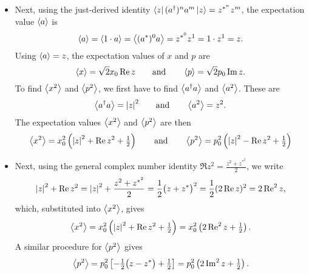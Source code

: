 \documentclass[11pt, a4paper]{article}
\newcommand{\eqtext}[1]{\qquad \text{#1} \qquad}
\newcommand{\evb}[1]{\big \langle {#1} \big \rangle}  %
\begin{document}
\begin{itemize}
	\item Next, using the just-derived identity $ \bra{z}(a^{\dagger})^{n}a^{m}\ket{z} = z^{*^{n}}z^{m} $, the expectation value $ \ev{a} $ is
	\begin{equation*}
		\ev{a} = \ev{1\cdot a} = \ev{(a^{*})^{0}a} = z^{*^{0}}z^{1} = 1 \cdot z^{1} = z.
	\end{equation*}
	Using $ \ev{a} = z $, the expectation values of $ x $ and $ p $ are
	\begin{equation*}
		\ev{x} = \sqrt{2} x_{0}\Re z \eqtext{and} \ev{p} = \sqrt{2}p_{0}\Im z.
	\end{equation*}
	To find $ \ev{x^{2}} $ and $ \ev{p^{2}} $, we first have to find $ \ev{a^{\dagger}a} $ and $ \ev{a^{2}} $. These are
	\begin{equation*}
		\evb{a^{\dagger}a} = \abs{z}^{2} \eqtext{and} \ev{a^{2}} = z^{2}.
	\end{equation*}
	The expectation values $ \ev{x^{2}} $ and $ \ev{p^{2}} $ are then
	\begin{equation*}
		\ev{x^{2}} = x_{0}^{2} \left(\abs{z}^{2} + \Re z^{2} + \tfrac{1}{2}\right) \eqtext{and} \ev{p^{2}} = p_{0}^{2}\left(\abs{z}^{2} - \Re z^{2} + \tfrac{1}{2}\right)
	\end{equation*}
	
	\item Next, using the  general complex number identity $ \Re z^{2} = \frac{z^{2}+z^{*^{2}}}{2}  $, we write
	\begin{equation*}
		\abs{z}^{2} + \Re z^{2} = \abs{z}^{2} + \frac{z^{2}+z^{*^{2}}}{2} = \frac{1}{2}\big(z + z^{*}\big)^{2} = \frac{1}{2}(2\Re z)^{2} = 2 \Re^{2}z,
	\end{equation*}
	which, substituted into $ \ev{x^{2}} $, gives
	\begin{equation*}
		\ev{x^{2}} = x_{0}^{2} \left(\abs{z}^{2} + \Re z^{2} + \tfrac{1}{2}\right) = x_{0}^{2}\left(2 \Re^{2}z + \tfrac{1}{2}\right).
	\end{equation*}
	A similar procedure for $ \ev{p^{2}} $ gives
	\begin{equation*}
		\ev{p^{2}} = p_{0}^{2}\left[-\tfrac{1}{2}\big(z-z^{*}\big) + \tfrac{1}{2}\right] = p_{0}^{2}\left(2 \Im^{2}z + \tfrac{1}{2}\right).
	\end{equation*}
	

\end{itemize}
\end{document}
